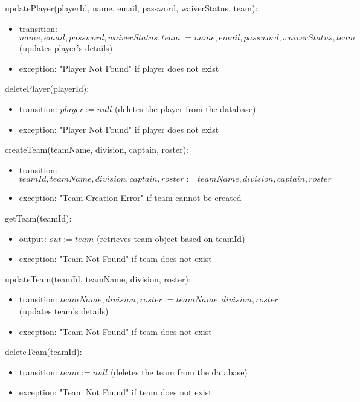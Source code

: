\documentclass[12pt, titlepage]{article}
\begin{document}
\noindent updatePlayer(playerId, name, email, password, waiverStatus, team):
\begin{itemize}
  \item transition: $name, email, password, waiverStatus, team := name, email, password, waiverStatus, team$ (updates player's details)
  \item exception: "Player Not Found" if player does not exist
\end{itemize}

\noindent deletePlayer(playerId):
\begin{itemize}
  \item transition: $player := null$ (deletes the player from the database)
  \item exception: "Player Not Found" if player does not exist
\end{itemize}

\noindent createTeam(teamName, division, captain, roster):
\begin{itemize}
  \item transition: $teamId, teamName, division, captain, roster := teamName, division, captain, roster$
  \item exception: "Team Creation Error" if team cannot be created
\end{itemize}

\noindent getTeam(teamId):
\begin{itemize}
  \item output: $out := team$ (retrieves team object based on teamId)
  \item exception: "Team Not Found" if team does not exist
\end{itemize}

\noindent updateTeam(teamId, teamName, division, roster):
\begin{itemize}
  \item transition: $teamName, division, roster := teamName, division, roster$ (updates team's details)
  \item exception: "Team Not Found" if team does not exist
\end{itemize}

\noindent deleteTeam(teamId):
\begin{itemize}
  \item transition: $team := null$ (deletes the team from the database)
  \item exception: "Team Not Found" if team does not exist
\end{itemize}
\end{document}
